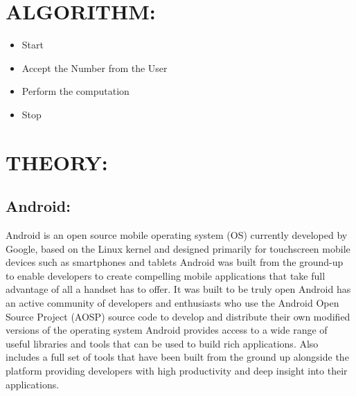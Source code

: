 \documentclass[11pt]{article}
\begin{document}
\section{ALGORITHM:}
	\begin{itemize}
		\item Start
		\item Accept the Number from the User
		\item Perform the computation
		\item Stop
	\end{itemize}

\section{THEORY:}
	\subsection{Android:}
		 Android is an open source mobile operating system (OS) currently developed by Google, based on the Linux kernel and designed primarily for touchscreen mobile devices such as smartphones and tablets \newline
Android was built from the ground-up to enable developers to create compelling mobile applications that take full advantage of all a handset has to oﬀer. It was built to be truly open \newline
Android has an active community of developers and enthusiasts who use the Android Open Source Project (AOSP) source code to develop and distribute their own modiﬁed versions of the operating system \newline
Android provides access to a wide range of useful libraries and tools that can be used to build rich applications. Also includes a full set of tools that have been built from the ground up alongside the platform providing developers with high productivity and deep insight into their applications.\newline
\end{document}

